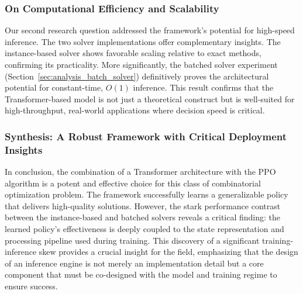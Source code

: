 \subsubsection{On Computational Efficiency and Scalability}
Our second research question addressed the framework's potential for high-speed inference. The two solver implementations offer complementary insights. The instance-based solver shows favorable scaling relative to exact methods, confirming its practicality. More significantly, the batched solver experiment (Section~\ref{sec:analysis_batch_solver}) definitively proves the architectural potential for constant-time, $O(1)$ inference. This result confirms that the Transformer-based model is not just a theoretical construct but is well-suited for high-throughput, real-world applications where decision speed is critical.

\subsubsection{Synthesis: A Robust Framework with Critical Deployment Insights}
In conclusion, the combination of a Transformer architecture with the PPO algorithm is a potent and effective choice for this class of combinatorial optimization problem. The framework successfully learns a generalizable policy that delivers high-quality solutions. However, the stark performance contrast between the instance-based and batched solvers reveals a critical finding: the learned policy's effectiveness is deeply coupled to the state representation and processing pipeline used during training. This discovery of a significant training-inference skew provides a crucial insight for the field, emphasizing that the design of an inference engine is not merely an implementation detail but a core component that must be co-designed with the model and training regime to ensure success.